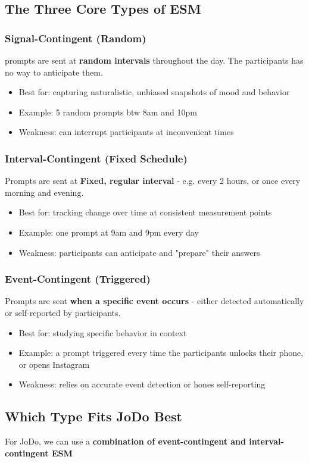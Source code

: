 \documentclass[12pt]{article}
\begin{document}
\subsection{The Three Core Types of ESM}
\subsubsection{Signal-Contingent (Random)}
prompts are sent at \textbf{random intervals} throughout the day. The participants has no way to anticipate them.
\begin{itemize}
   \item Best for: capturing naturalistic, unbiased snapshots of mood and behavior
   \item Example: 5 random prompts btw 8am and 10pm
   \item Weakness: can interrupt participants at inconvenient times
\end{itemize}
\subsubsection{Interval-Contingent (Fixed Schedule)}
Prompts are sent at \textbf{Fixed, regular interval} - e.g. every 2 hours, or once every morning and evening.
\begin{itemize}
    \item Best for: tracking change over time at consistent measurement points
    \item Example: one prompt at 9am and 9pm every day
    \item Weakness: participants can anticipate and "prepare" their answers
\end{itemize}
\subsubsection{Event-Contingent (Triggered)}
Prompts are sent \textbf{when a specific event occurs} - either detected automatically or self-reported by participants.
\begin{itemize}
    \item Best for: studying specific behavior in context
    \item Example: a prompt triggered every time the participants unlocks their phone, or opens Instagram
    \item Weakness: relies on accurate event detection or hones self-reporting
\end{itemize}
\subsection{Which Type Fits JoDo Best}
For JoDo, we can use a \textbf{combination of event-contingent and interval-contingent ESM}
\end{document}
